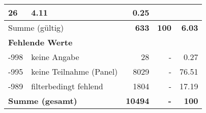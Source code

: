 \begin{longtable}{lXrrr}
       \num{26} &
       \num[round-mode=places,round-precision=2]{4,11} &
         \num[round-mode=places,round-precision=2]{0,25} \\
     \midrule
     \multicolumn{2}{l}{Summe (gültig)} &
       \textbf{\num{633}} &
     \textbf{100} &
       \textbf{\num[round-mode=places,round-precision=2]{6,03}} \\
     \multicolumn{5}{l}{\textbf{Fehlende Werte}}\\
       -998 &
       keine Angabe &
         \num{28} &
        - &
         \num[round-mode=places,round-precision=2]{0,27} \\
       -995 &
       keine Teilnahme (Panel) &
         \num{8029} &
        - &
         \num[round-mode=places,round-precision=2]{76,51} \\
       -989 &
       filterbedingt fehlend &
         \num{1804} &
        - &
         \num[round-mode=places,round-precision=2]{17,19} \\
     \midrule
     \multicolumn{2}{l}{\textbf{Summe (gesamt)}} &
          \textbf{\num{10494}} &
        \textbf{-} &
        \textbf{100} \\
     \bottomrule
     \end{longtable}
     
